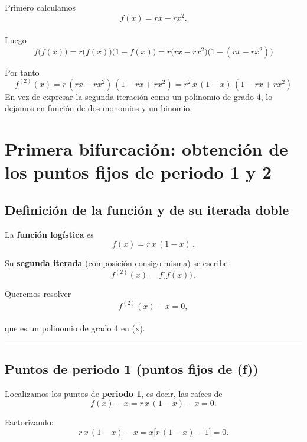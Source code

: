 \documentclass[
  11pt,
  a4paper,
  DIV=11,
  numbers=noendperiod]{scrreprt}
\begin{document}
Primero calculamos\\
\[
f(x) = r x - r x^2.
\]\\
Luego\\
\[
f\bigl(f(x)\bigr)
= r\bigl(f(x)\bigr)\bigl(1 - f(x)\bigr)
= r\bigl(r x - r x^2\bigr)\bigl(1 - (r x - r x^2)\bigr)
\]

Por tanto\\
\[
   f^{(2)}(x)
   = r\,(r x - r x^2)\,(1 - r x + r x^2)
   = r^2\,x\,(1 - x)\,(1 - r x + r x^2)
   \] En vez de expresar la segunda iteración como un polinomio de grado
4, lo dejamos en función de dos monomios y un binomio.

\section{Primera bifurcación: obtención de los puntos fijos de periodo 1
y
2}\label{primera-bifurcaciuxf3n-obtenciuxf3n-de-los-puntos-fijos-de-periodo-1-y-2}

\subsection{Definición de la función y de su iterada
doble}\label{definiciuxf3n-de-la-funciuxf3n-y-de-su-iterada-doble}

La \textbf{función logística} es\\
\[
f(x) = r\,x\,(1 - x)\,.
\]

Su \textbf{segunda iterada} (composición consigo misma) se escribe\\
\[
f^{(2)}(x) = f\bigl(f(x)\bigr)\,.
\]

Queremos resolver\\
\[
f^{(2)}(x) - x = 0,
\]\\
que es un polinomio de grado 4 en (x).

\begin{center}\rule{0.5\linewidth}{0.5pt}\end{center}

\subsection{Puntos de periodo 1 (puntos fijos de
(f))}\label{puntos-de-periodo-1-puntos-fijos-de-f}

Localizamos los puntos de \textbf{periodo 1}, es decir, las raíces de\\
\[
f(x) - x = r\,x\,(1 - x) - x = 0.
\]

Factorizando:\\
\[
r\,x\,(1 - x) - x
= x\bigl[r\,(1 - x) - 1\bigr]
= 0.
\]
\end{document}
